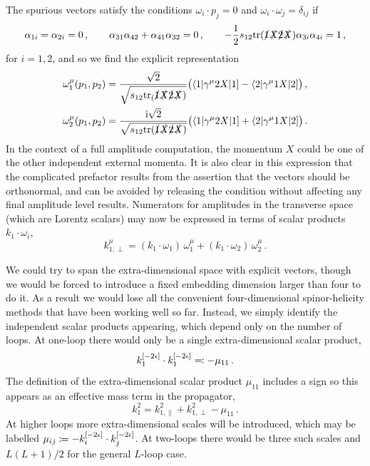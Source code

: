 The spurious vectors satisfy the conditions $\omega_i\cdot p_j = 0$ and $\omega_i\cdot \omega_j = \delta_{ij}$ if
\begin{align}
  \alpha_{1i} = \alpha_{2i} = 0 \,, \qquad
  \alpha_{31}\alpha_{42} + \alpha_{41}\alpha_{32} = 0 \,, \qquad
  - \frac{1}{2} s_{12} {\rm tr}(\slashed1 \slashed{X} \slashed2 \slashed{X}) \alpha_{3i} \alpha_{4i} = 1 \,,
  \label{eq:spuriousvectorexampeEQ2}
\end{align}
for $i=1,2$, and so we find the explicit representation
\begin{align} \label{eq:triangle_omegas}
\begin{aligned}
  \omega_1^\mu(p_1,p_2) &= \frac{\sqrt{2}}{\sqrt{s_{12}{\rm tr}_(\slashed1 \slashed{X} \slashed2 \slashed{X})}}\bigl(\langle 1 | \gamma^\mu 2 X | 1 ]  - \langle 2 | \gamma^\mu 1 X  | 2 ]\bigr) \,, \\
  \omega_2^\mu(p_1,p_2) &= \frac{\mathrm{i}\sqrt{2}}{\sqrt{s_{12}{\rm tr}(\slashed1 \slashed{X} \slashed2 \slashed{X})}}\bigl(\langle 1 | \gamma^\mu 2 X | 1 ]  + \langle 2 | \gamma^\mu 1 X | 2 ]\bigr) \,.
\end{aligned} 
\end{align}
In the context of a full amplitude computation, the momentum $X$ could be one
of the other independent external momenta. It is also clear in this expression that
the complicated prefactor results from the assertion that the vectors should be
orthonormal, and can be avoided by releasing the condition without affecting any
final amplitude level results. Numerators for amplitudes in the transverse
space (which are Lorentz scalars) may now be expressed in terms of scalar
products $k_1\cdot \omega_i$,
\begin{equation}
  k^\mu_{1,\perp} =  (k_1\cdot \omega_1) \, \omega_1^\mu + (k_1\cdot \omega_2) \, \omega_2^\mu \,.
\end{equation}

We could try to span the extra-dimensional space with explicit vectors, though
we would be forced to introduce a fixed embedding dimension larger than four to
do it. As a result we would lose all the convenient four-dimensional spinor-helicity methods
that have been working well so far. Instead, we simply identify the independent
scalar products appearing, which depend only on the number of loops. At one-loop
there would only be a single extra-dimensional scalar product,
\begin{equation}
  k_1^{[-2\epsilon]}\cdot k_1^{[-2\epsilon]} \eqqcolon -\mu_{11}\,.
  \label{eq:extradimSP1}
\end{equation}
The definition of the extra-dimensional scalar product $\mu_{11}$
includes a sign so this appears as an effective mass term in the
propagator,
\begin{equation}
  k_1^2 = k_{1,\parallel}^2 + k_{1,\perp}^2 - \mu_{11}\,.
\end{equation}
At higher loops more extra-dimensional scales will be introduced, which may be
labelled $\mu_{ij} \coloneqq - k_i^{[-2\epsilon]} \cdot k_j^{[-2\epsilon]}$. At
two-loops there would be three such scales and $L(L+1)/2$ for the general $L$-loop case.

